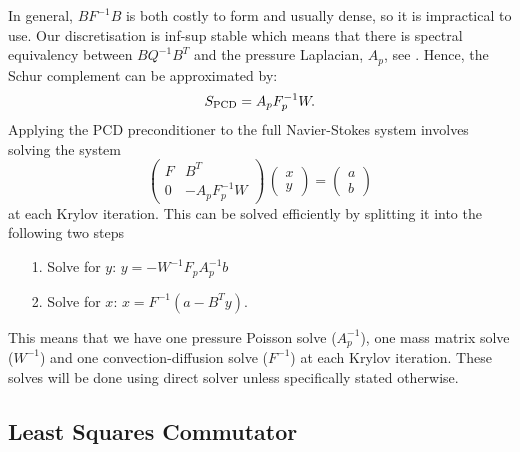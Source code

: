 In general, $BF^{-1}B$ is both costly to form and usually dense, so it is impractical to use.  Our discretisation is inf-sup stable which means that there is spectral equivalency between $BQ^{-1}B^T$ and the pressure Laplacian, $A_p$, see \cite[Section 5.5.1]{elman2005finite}. Hence, the Schur complement can be approximated by:
$$S_{\rm PCD} =A_p F_p^{-1}W.$$
Applying the PCD preconditioner to the full Navier-Stokes system involves solving the system
\begin{equation} \nonumber
\left(
\begin{array}{cc}
F & B^T \\
0 & -A_p F_p^{-1}W
\end{array}
\right)
\,
\left(
\begin{array}{c}
x \\
y
\end{array}
\right) =
\left(
\begin{array}{c}a\\b
\end{array}
\right)
\end{equation}
at each Krylov iteration. This can be solved  efficiently by splitting it into the following two steps
\begin{itemize} \label{it:PCDsolve}
    \item[1.] Solve for $y$: $y = -W^{-1}F_p A_p^{-1}b$
    \item[2.] Solve for $x$: $x = F^{-1}(a-B^Ty).$
\end{itemize}
This means that we have one pressure Poisson solve ($A_p^{-1}$), one mass matrix solve ($W^{-1}$) and one convection-diffusion solve ($F^{-1}$) at each Krylov iteration. These solves will be done using direct solver unless specifically stated otherwise.

\subsection{Least Squares Commutator}


